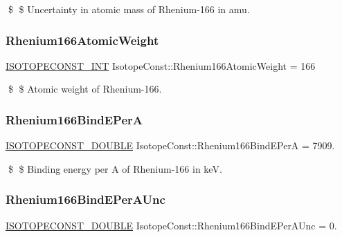 \$ \$ Uncertainty in atomic mass of Rhenium-\/166 in amu. \mbox{\label{group___isotope_const-_rhenium-_re166_ga0fdf54980b6504f7246336a980cd545a}} 
\subsubsection{\texorpdfstring{Rhenium166\+Atomic\+Weight}{Rhenium166AtomicWeight}}
{\footnotesize\ttfamily \mbox{\hyperlink{group___isotope_const-_macros_ga5f18360b3e99483a35c32d789e62621c}{I\+S\+O\+T\+O\+P\+E\+C\+O\+N\+S\+T\+\_\+\+I\+NT}} Isotope\+Const\+::\+Rhenium166\+Atomic\+Weight = 166}

\$ \$ Atomic weight of Rhenium-\/166. \mbox{\label{group___isotope_const-_rhenium-_re166_ga0fa89ab1ff58c7c545cb485dfd47933a}} 
\subsubsection{\texorpdfstring{Rhenium166\+Bind\+E\+PerA}{Rhenium166BindEPerA}}
{\footnotesize\ttfamily \mbox{\hyperlink{group___isotope_const-_macros_ga8f45a7272ce02c0b4c65c44636ed719a}{I\+S\+O\+T\+O\+P\+E\+C\+O\+N\+S\+T\+\_\+\+D\+O\+U\+B\+LE}} Isotope\+Const\+::\+Rhenium166\+Bind\+E\+PerA = 7909.}

\$ \$ Binding energy per A of Rhenium-\/166 in keV. \mbox{\label{group___isotope_const-_rhenium-_re166_ga66c5407f6cfa0ee6d489f3fa2055e043}} 
\subsubsection{\texorpdfstring{Rhenium166\+Bind\+E\+Per\+A\+Unc}{Rhenium166BindEPerAUnc}}
{\footnotesize\ttfamily \mbox{\hyperlink{group___isotope_const-_macros_ga8f45a7272ce02c0b4c65c44636ed719a}{I\+S\+O\+T\+O\+P\+E\+C\+O\+N\+S\+T\+\_\+\+D\+O\+U\+B\+LE}} Isotope\+Const\+::\+Rhenium166\+Bind\+E\+Per\+A\+Unc = 0.}

